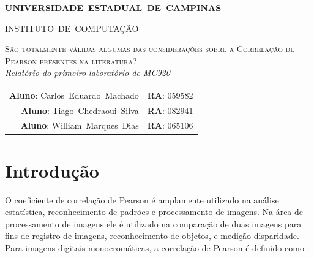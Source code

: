 \documentclass[10pt,a4paper]{article}
\begin{document}
\begin{titlepage}
  \thispagestyle{empty}
  \begin{center} {\large \textbf{UNIVERSIDADE~ESTADUAL~DE~CAMPINAS}} \end{center}
  \begin{center} {\large INSTITUTO~DE~COMPUTAÇÃO}                    \end{center}
  \vspace{0.1cm}
  \begin{center}
    \begin{minipage}[tl]{31mm}
    \end{minipage}
  \end{center}
  \vspace{0.3cm}
  \begin{center} 
    {\large \textsc{São totalmente válidas algumas das considerações sobre a
        Correlação de Pearson presentes na literatura?  }} 
    \\\vspace{0.5cm}
    {\textsl{Relatório do primeiro laboratório de MC920}}
    \\\vspace{1cm}
    \begin{tabular}{rl}
      \textbf{Aluno}:   Carlos~Eduardo~Machado &  
      \textbf{RA}:          059582 \\ 
      \textbf{Aluno}:        Tiago~Chedraoui~Silva & 
      \textbf{RA}:        082941 \\
      \textbf{Aluno}:        William~Marques~Dias & 
      \textbf{RA}:        065106 \\
    \end{tabular}
  \end{center}
  \vspace{0.5cm}

  \begin{abstract}
    O coeficiente de correlação de Pearson é amplamente usado para
    comparar imagens, contudo ele apresenta sérias limitações. Esse
    trabalho consistiu na validação da análise realizada no Artigo ''The
    Ineffectiveness of the Correlation Coefficient for Image Comparisons''.
  \end{abstract}
  \tableofcontents
\end{titlepage} 

\vspace{2mm}
\newpage

\section{Introdução}
O coeficiente de correlação de Pearson é amplamente
utilizado na análise estatística, reconhecimento de padrões e
processamento de imagens.
Na área de processamento de imagens ele é utilizado na comparação de
duas imagens para fins de registro de imagens, reconhecimento de
objetos, e medição disparidade. Para imagens digitais monocromáticas, a correlação de Pearson é definido como :
\end{document}
